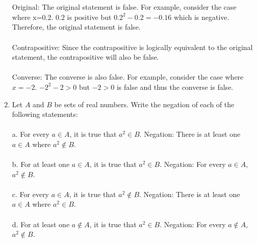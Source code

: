 \documentclass[]{article}
\begin{document}
\begin{enumerate}
    \\\\Original: The original statement is false. For example, consider the case where x=0.2. $0.2$ is positive but $0.2^2-0.2=-0.16$ which is negative. Therefore, the original statement is false.
    \\\\Contrapositive: Since the contrapositive is logically equivalent to the original statement, the contrapositive will also be false.
    \\\\Converse: The converse is also false. For example, consider the case where $x=-2$. $-2^2-2>0$ but $-2>0$ is false and thus the converse is false.
    
    \item Let $A$ and $B$ be sets of real numbers. Write the negation of each of the following statements:
    \\\\ a. For every $a \in A$, it is true that $a^2 \in B$.
    \newline Negation: There is at least one $a \in A$ where $a^2 \notin B$.
    \\\\ b. For at least one $a \in A$, it is true that $a^2 \in B$.
    \newline Negation: For every $a \in A$, $a^2 \notin B$.
    \\\\ c. For every $a \in A$, it is true that $a^2 \notin B$.
    \newline Negation: There is at least one $a \in A$ where $a^2 \in B$.
    \\\\ d. For at least one $a \notin A$, it is true that $a^2 \in B$.
    \newline Negation: For every $a \notin A$, $a^2 \notin B$.
    

\end{enumerate}
\end{document}
